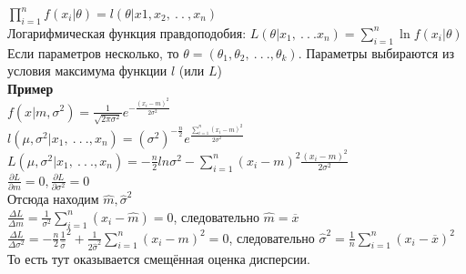 \documentclass[russian, 12pt, fleqn]{article}
\begin{document}
$\displaystyle{\prod_{i = 1} ^ n} f(x_i|\theta) = l(\theta|x1,x_2,\ .\ .\ ,x_n)$\\
Логарифмическая функция правдоподобия: $L(\theta|x_1,\ .\ .\ . x_n) = \displaystyle{\sum \limits_{i = 1} ^ {n}} \ln f(x_i|\theta)$\\
Если параметров несколько, то $\theta = (\theta_1, \theta_2, \ .\ .\ . ,\theta_k)$. Параметры выбираются из условия максимума функции $l$ (или $L$)\\
\textbf{Пример}\\ 
$f(x|m, \sigma^2) = \frac{1}{\sqrt{2\pi\sigma^2}} e^{-\frac{(x_i - m)^2}{2\sigma^2}}$\\
$l(\mu, \sigma^2|x_1, \ .\ .\ ., x_n) = (\sigma^2)^{-\frac{n}{2}}e^{\frac{\displaystyle{\sum \limits_{i = 1}^{n}(x_i - m)^2}}{2\sigma^2}}$\\
$L(\mu, \sigma^2|x_1, \ .\ .\ ., x_n) = - \frac{n}{2} ln \sigma^2 - \displaystyle{\sum \limits_{i = 1}^{n}}(x_i - m)^2\frac{(x_i - m)^2}{2\sigma^2}$\\
$\frac{\partial L}{\partial m} = 0, \frac{\partial L}{\partial \sigma^2} = 0$\\
Отсюда находим $\hat{m}, \hat{\sigma}^2$\\
$\frac{\Delta L}{\Delta m} = \frac{1}{\sigma^2} \displaystyle{\sum \limits _{i = 1} ^ {n} } (x_i - \hat{m}) = 0$, следовательно $\hat{m} = \overline{x}$\\
$\frac{\Delta L}{\Delta \sigma^2} = -\frac{n}{2} \frac{1}{\hat{\sigma}}^2 + \frac{1}{2\hat{\sigma}^2}  \displaystyle{\sum \limits _{i = 1} ^ {n} } (x_i - m)^2 = 0$, следовательно 
$\hat{\sigma}^2 = \frac{1}{n}  \displaystyle{\sum \limits _{i = 1} ^ {n} } (x_i - \overline{x})^2$\\
То есть тут оказывается смещённая оценка дисперсии.
\end{document}
